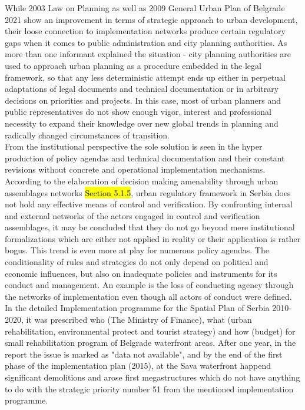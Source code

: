\documentclass[11pt]{report}
\begin{document}
While 2003 Law on Planning as well as 2009 General Urban Plan of Belgrade 2021 show an improvement in terms of strategic approach to urban development, their loose connection to implementation networks produce certain regulatory gaps when it comes to public administration and city planning authorities. As more than one informant explained the situation - city planning authorities are used to approach urban planning as a procedure embedded in the legal framework, so that any less deterministic attempt ends up either in perpetual adaptations of legal documents and technical documentation or in arbitrary decisions on priorities and projects.
In this case, most of urban planners and public representatives do not show enough vigor, interest and professional necessity to expand their knowledge over new global trends in planning and radically changed circumstances  of transition.
\\
From the institutional perspective the sole solution is seen in the hyper production of policy agendas and technical documentation and their constant revisions without concrete and operational implementation mechanisms.\footnotemark 
According to the elaboration of decision making amenability through urban assemblages networks \hl{Section 5.1.5}, urban regulatory framework in Serbia does not hold any effective means of control and verification. By confronting internal and external networks of the actors engaged in control and verification assemblages, it may be concluded that they do not go beyond mere institutional formalizations which are either not applied in reality or their application is rather bogus.
This trend is even more at play for numerous policy agendas.
The conditionality of rules and strategies do not only depend on political and economic influences, but also on inadequate policies and instruments for its conduct and management. An example is the loss of conducting agency through the networks of implementation even though all actors of conduct were defined. In the detailed Implementation programme for the Spatial Plan of Serbia 2010-2020, it was prescribed who (The Ministry of Finance), what (urban rehabilitation, environmental protect and tourist strategy) and how (budget) for small rehabilitation program of Belgrade waterfront areas. After one year, in the report the issue is marked as "data not available", and by the end of the first phase of the implementation plan (2015), at the Sava waterfront happend significant demolitions and arose first megastructures which do not have anything to do with the strategic priority number 51 from the mentioned implementation programme.
\end{document}
